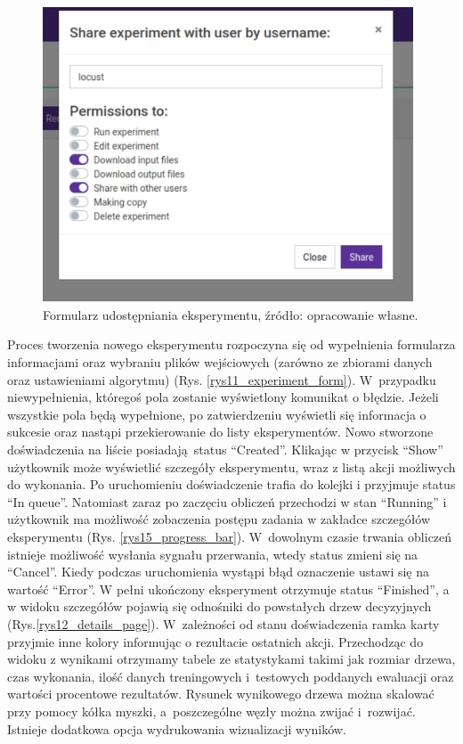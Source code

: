 \begin{figure}[htb]
	\centering
	\includegraphics[width=11cm]{grafika/share_form.eps}
	\caption{Formularz udostępniania eksperymentu, źródło: opracowanie własne.}
	\label{rys14_share_form}
\end{figure}


Proces tworzenia nowego eksperymentu rozpoczyna się od wypełnienia formularza informacjami oraz wybraniu plików wejściowych (zarówno ze zbiorami danych oraz ustawieniami algorytmu) (Rys. \ref{rys11_experiment_form}). W~przypadku niewypełnienia, któregoś pola zostanie wyświetlony komunikat o błędzie. Jeżeli wszystkie pola będą wypełnione, po zatwierdzeniu wyświetli się informacja o sukcesie oraz nastąpi przekierowanie do listy eksperymentów. Nowo stworzone doświadczenia na liście posiadają status \enquote{Created}. Klikając w przycisk \enquote{Show} użytkownik może wyświetlić szczegóły eksperymentu, wraz z listą akcji możliwych do wykonania. Po uruchomieniu doświadczenie trafia do kolejki i przyjmuje status \enquote{In queue}. Natomiast zaraz po zaczęciu obliczeń przechodzi w stan \enquote{Running} i użytkownik ma możliwość zobaczenia postępu zadania w zakładce szczegółów eksperymentu (Rys. \ref{rys15_progress_bar}). W~dowolnym czasie trwania obliczeń istnieje możliwość wysłania sygnału przerwania, wtedy status zmieni się na \enquote{Cancel}. Kiedy podczas uruchomienia wystąpi błąd oznaczenie ustawi się na wartość \enquote{Error}. W pełni ukończony eksperyment otrzymuje status \enquote{Finished}, a w widoku szczegółów pojawią się odnośniki do powstałych drzew decyzyjnych (Rys.\ref{rys12_details_page}). W~zależności od stanu doświadczenia ramka karty przyjmie inne kolory informując o rezultacie ostatnich akcji. Przechodząc do widoku z wynikami otrzymamy tabele ze statystykami takimi jak rozmiar drzewa, czas wykonania, ilość danych treningowych i~testowych poddanych ewaluacji oraz wartości procentowe rezultatów. Rysunek wynikowego drzewa można skalować przy pomocy kółka myszki, a~poszczególne węzły można zwijać i~rozwijać. Istnieje dodatkowa opcja wydrukowania wizualizacji wyników.

